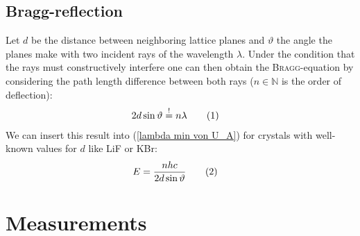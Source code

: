 \documentclass[a4paper,12pt]{article}
\newcommand\numberthis{\addtocounter{equation}{1}\tag{\theequation}}
\begin{document}
\subsection{Bragg-reflection}
Let $d$ be the distance between neighboring lattice planes and $\vartheta$ the angle the planes make with two incident rays of the wavelength $\lambda$. Under the condition that the rays must constructively interfere one can then obtain the \textsc{Bragg}-equation by considering the path length difference between both rays ($n\in\mathbb{N}$ is the order of deflection):
\begin{align*}
2d\sin\vartheta &\overset{!}{=}n\lambda\numberthis\label{Bragg eq}
\end{align*}
We can insert this result into (\ref{lambda min von U_A}) for crystals with well-known values for $d$ like LiF or KBr:
\begin{align*}
E&=\frac{nhc}{2d\sin\vartheta}\numberthis\label{Bragg energy}
\end{align*}
\section{Measurements}
\end{document}
